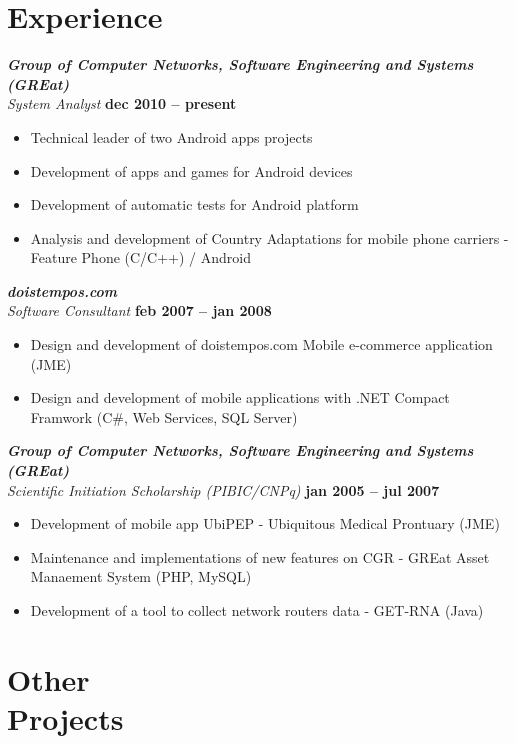 \documentclass[margin, 10pt]{res} %
\begin{document}
\begin{resume}
\section{Experience}
{\sl\bf Group of Computer Networks, Software Engineering and Systems (GREat)}  \\
{\sl System Analyst} \hfill {\bf dec 2010 -- present}
\begin{itemize} \itemsep -2pt %
\item Technical leader of two Android apps projects
\item Development of apps and games for Android devices
\item Development of automatic tests for Android platform
\item Analysis and development of Country Adaptations for mobile phone carriers - Feature Phone (C/C++) / Android
\end{itemize}
 
{\sl\bf doistempos.com} \\
{\sl Software Consultant} \hfill {\bf feb 2007 -- jan 2008}
\begin{itemize} \itemsep -2pt 
\item Design and development of doistempos.com Mobile e-commerce application (JME)
\item Design and development of mobile applications with .NET Compact Framwork (C\#, Web Services, SQL Server)
\end{itemize} 


{\sl\bf Group of Computer Networks, Software Engineering and Systems (GREat)}  \\
{\sl Scientific Initiation Scholarship (PIBIC/CNPq)} \hfill {\bf jan 2005 -- jul 2007}
\begin{itemize} \itemsep -2pt %
\item Development of mobile app UbiPEP - Ubiquitous Medical Prontuary (JME)
\item Maintenance and implementations of new features on CGR - GREat Asset Manaement System (PHP, MySQL)
\item Development of a tool to collect network routers data - GET-RNA (Java)
\end{itemize}


\section{Other \\ Projects}


\end{resume}
\end{document}
